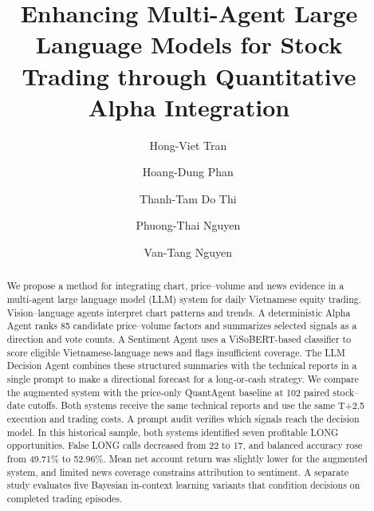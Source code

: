 \documentclass[preprint,12pt]{elsarticle}
\begin{document}
\begin{frontmatter}


\title{Enhancing Multi-Agent Large Language Models for Stock Trading through Quantitative Alpha Integration}

\author[1]{Hong-Viet Tran\,}
\author[1]{Hoang-Dung Phan\,}
\author[1,2]{Thanh-Tam Do Thi\,}
\author[1]{Phuong-Thai Nguyen\,}
\author[3]{Van-Tang Nguyen\,}






\begin{abstract}
We propose a method for integrating chart, price--volume and news
evidence in a multi-agent large language model (LLM) system for daily
Vietnamese equity trading. Vision--language agents interpret chart
patterns and trends. A deterministic Alpha Agent ranks 85 candidate
price--volume factors and summarizes selected signals as a direction
and vote counts. A Sentiment Agent uses a ViSoBERT-based classifier to
score eligible Vietnamese-language news and flags insufficient coverage.
The LLM Decision Agent combines these structured summaries with the
technical reports in a single prompt to make a directional forecast
for a long-or-cash strategy.
We compare the augmented system with the price-only QuantAgent baseline
at 102 paired stock--date cutoffs. Both systems receive the same
technical reports and use the same T+2.5 execution and trading costs.
A prompt audit verifies which signals reach the decision model.
In this historical sample, both systems identified seven profitable
LONG opportunities. False LONG calls decreased from 22 to 17, and
balanced accuracy rose from 49.71\% to 52.96\%. Mean net account return
was slightly lower for the augmented system, and limited news coverage
constrains attribution to sentiment. A separate study evaluates five
Bayesian in-context learning variants that condition decisions on
completed trading episodes.
\end{abstract}


\end{frontmatter}
\end{document}
